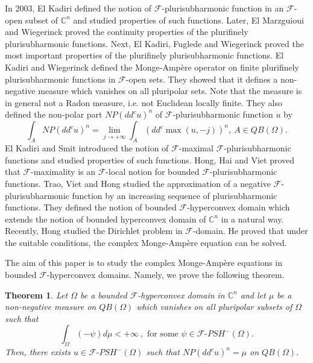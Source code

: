 \documentclass[3p,times]{elsarticle}
\numberwithin{equation}{section}
\newtheorem{theorem}{Theorem}[section]
\newtheorem{The main theorem}[theorem]{The main theorem}
\theoremstyle{definition}
\begin{document}
In 2003,
El Kadiri  \cite{K03} defined   the notion of $\mathcal F$-plurisubharmonic function in an $\mathcal F$-open subset of $\mathbb C^n$ and studied properties of such functions.   Later, 
El Marzguioui and Wiegerinck \cite{MW10}  proved the continuity properties of the plurifinely plurisubharmonic functions.  Next, 
El Kadiri,  Fuglede and Wiegerinck \cite{KFW11} proved  the most important properties of the  plurifinely plurisubharmonic functions.  
El Kadiri and Wiegerinck  \cite{KW14}  defined   the Monge-Amp\`{e}re operator on finite   plurifinely plurisubharmonic functions in $\mathcal F$-open sets.
They showed that it defines a non-negative measure  which vanishes on all pluripolar sets.  
Note that the measure is in general not a Radon measure, i.e. not Euclidean locally finite. %
They also defined the non-polar part $NP(dd^c u)^n$ of $\mathcal F$-plurisubharmonic function  $u$  by
 $$
\int_A NP(dd^c u)^n = \lim_{j\to+\infty} \int_A  (dd^c \max(u,-j))^n, \ A\in QB(\Omega).
$$ 
El Kadiri and  Smit \cite{KS14} 
introduced   the notion of $\mathcal F$-maximal $\mathcal F$-plurisubharmonic functions  and studied properties of such functions.  
  Hong, Hai and Viet \cite{HHV17}   proved that $\mathcal F$-maximality is an $\mathcal F$-local notion for bounded $\mathcal F$-plurisubharmonic functions.  
 Trao, Viet and Hong  \cite{TVH}  
studied  the approximation of a negative $\mathcal F$-plurisubharmonic function  by an increasing sequence of plurisubharmonic functions.
They defined   the notion  of   bounded  $\mathcal F$-hyperconvex domain 
which extends the notion of bounded hyperconvex domain of $\mathbb C^n$  in a natural way. 
Recently,  Hong \cite{Hong17}  studied the Dirichlet problem in  $\mathcal F$-domain.  He 
proved  that under the suitable conditions, the  complex Monge-Amp\`ere equation can be solved. 


The aim of this paper is to  study the  complex Monge-Amp\`ere equations  in  bounded $\mathcal F$-hyperconvex domains. 
Namely, we prove the following theorem. 


\begin{theorem} \label{the1}
Let $\Omega  $ be a bounded $\mathcal F$-hyperconvex domain in $\mathbb C^n$ and let    $\mu$ be a  non-negative measure  on $QB(\Omega)$ which  vanishes  on all  pluripolar subsets of $\Omega$ such that  
\begin{equation}\label{ii}
\int_\Omega (-\psi) d \mu <+\infty \ , \text{  for some } \psi \in \mathcal F \text{-} PSH^-(\Omega).
\end{equation}
Then, there exists   $u\in  \mathcal F \text{-} PSH^- (\Omega) $ such that $NP(dd^c u)^n = \mu$ on $QB(\Omega)$. 
\end{theorem}
\end{document}
